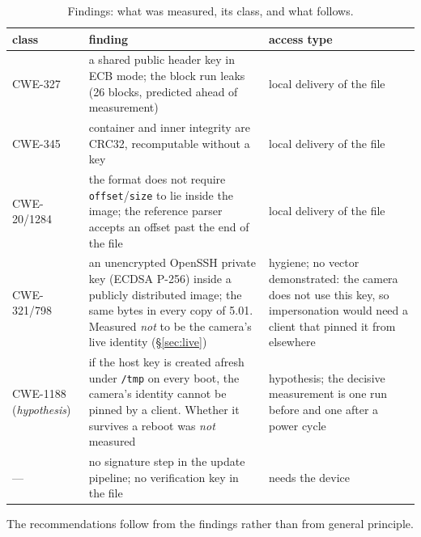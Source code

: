 \documentclass[12pt]{article}
\newcommand{\code}[1]{\texttt{\small #1}}
\begin{document}
\begin{table}[htbp]\centering
\small
\caption{Findings: what was measured, its class, and what follows.}
\label{tab:findings}
\begin{tabular}{p{}p{}p{}}
\toprule
class & finding & access type \\
\midrule
CWE-327 & a shared public header key in ECB mode; the block run leaks (26 blocks, predicted
ahead of measurement) & local delivery of the file \\
CWE-345 & container and inner integrity are CRC32, recomputable without a key &
local delivery of the file \\
CWE-20/1284 & the format does not require \code{offset}/\code{size} to lie inside the image;
the reference parser accepts an offset past the end of the file & local delivery of the file \\
CWE-321/798 & an unencrypted OpenSSH private key (ECDSA P-256) inside a publicly distributed
image; the same bytes in every copy of 5.01. Measured \emph{not} to be the camera's live
identity (\S\ref{sec:live}) & hygiene; no vector demonstrated: the camera does not use this
key, so impersonation would need a client that pinned it from elsewhere \\
CWE-1188 (\emph{hypothesis}) & if the host key is created afresh under \code{/tmp} on every
boot, the camera's identity cannot be pinned by a client. Whether it survives a reboot was
\emph{not} measured & hypothesis; the decisive measurement is one run before and one after a
power cycle \\
--- & no signature step in the update pipeline; no verification key in the file &
needs the device \\
\bottomrule
\end{tabular}
\end{table}

The recommendations follow from the findings rather than from general principle.
\end{document}
